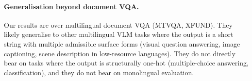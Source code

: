 \paragraph{Generalisation beyond document VQA.}
Our results are over multilingual document VQA (MTVQA, XFUND). They likely generalise to other multilingual VLM tasks where the output is a short string with multiple admissible surface forms (visual question answering, image captioning, scene description in low-resource languages). They do not directly bear on tasks where the output is structurally one-hot (multiple-choice answering, classification), and they do not bear on monolingual evaluation.
